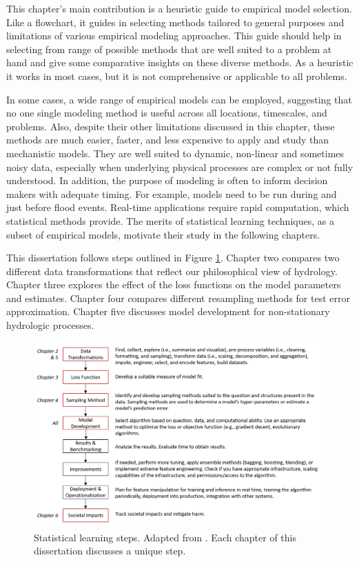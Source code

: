 This chapter's main contribution is a heuristic guide to empirical model selection. Like a flowchart, it guides in selecting methods tailored to general purposes and limitations of various empirical modeling approaches. This guide should help in selecting from range of possible methods that are well suited to a problem at hand and give some comparative insights on these diverse methods. As a heuristic it works in most cases, but it is not comprehensive or applicable to all problems. 

In some cases, a wide range of empirical models can be employed, suggesting that no one single modeling method is useful across all locations, timescales, and problems. Also, despite their other limitations discussed in this chapter, these methods are much easier, faster, and less expensive to apply and study than mechanistic models. They are well suited to dynamic, non-linear and sometimes noisy data, especially when underlying physical processes are complex or not fully understood. In addition, the purpose of modeling is often to inform decision makers with adequate timing. For example, models need to be run during and just before flood events. Real-time applications require rapid computation, which statistical methods provide. The merits of statistical learning techniques, as a subset of empirical models, motivate their study in the following chapters.

This dissertation follows steps outlined in Figure \ref{fig:steps}. Chapter two compares two different data transformations that reflect our philosophical view of hydrology. Chapter three explores the effect of the loss functions on the model parameters and estimates. Chapter four compares different resampling methods for test error approximation. Chapter five discusses model development for non-stationary hydrologic processes. 

\begin{figure}[H]
	\centering
	\includegraphics[width=\textwidth,trim={0 0 0 0},clip=true]{plots/ch1_diss_steps.png}
	\caption{Statistical learning steps. Adapted from \protect{}. Each chapter of this dissertation discusses a unique step.} 
	\label{fig:steps}
\end{figure}

